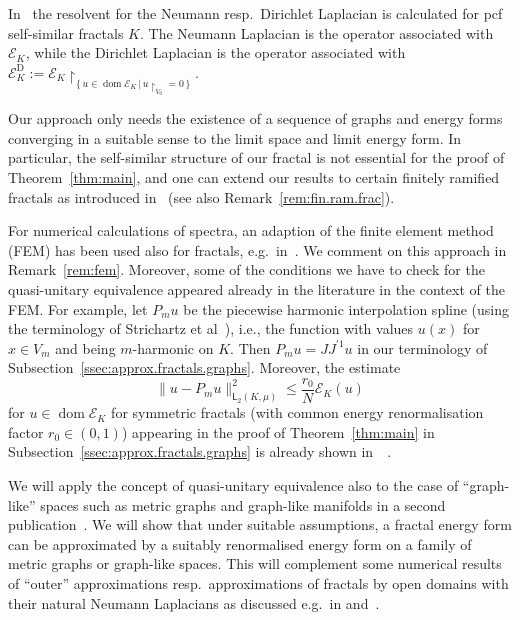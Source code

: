 \documentclass[12pt,reqno,a4paper]{amsart}            %
\numberwithin{equation}{section}
\theoremstyle{mythmstyle}       %
\newcounter{intro}
\theoremstyle{mydefstyle}        %
\newcommand{\Subsec}[1]{Subsection~\ref{ssec:#1}}
\newcommand{\Thm}[1]{Theorem~\ref{thm:#1}}
\newcommand{\Rem}[1]{Remark~\ref{rem:#1}}
\newcommand{\normsymb}{\|}
\newcommand{\normsqr}[2][{}]{\normsymb{#2}\normsymb^2_{#1}} %
\newcommand{\set}[2]{\{ \, #1 \, | \, #2 \, \} }      %
\newcommand{\restr}[1]{{\restriction}_{#1}} %
\DeclareMathOperator{\dom}    {dom}
\newcommand{\1}{\mathbbm 1}                    %
\newcommand{\Lsymb}    {\mathsf L}     %
\newcommand{\Lpspace}[1][p]    {\Lsymb_{#1}}     %
\newcommand{\Lsqrspace}    {\Lpspace[2]}     %
\newcommand{\Lsqr}[2][{}]{\Lsqrspace^{#1}({#2})} %
\newcommand{\Dir}{{\mathrm D}}              %
\newcommand{\pcf}{pcf\xspace}
\newcommand{\energy}{\mathcal E}
\begin{document}
In~\cite{iprrs:10} the resolvent for the Neumann resp.\ Dirichlet
Laplacian is calculated for \pcf self-similar fractals $K$.  The
Neumann Laplacian is the operator associated with $\energy_K$, while
the Dirichlet Laplacian is the operator associated with
$\energy_K^\Dir := \energy_K \restr {\set{u \in \dom \energy_K}{u
    \restr {V_0}=0}}$.

Our approach only needs the existence of a sequence of graphs and
energy forms converging in a suitable sense to the limit space and
limit energy form.  In particular, the self-similar structure of our
fractal is not essential for the proof of \Thm{main}, and one can
extend our results to certain finitely ramified fractals as introduced
in~\cite{teplyaev:08} (see also \Rem{fin.ram.frac}).

For numerical calculations of spectra, an adaption of the finite
element method (FEM) has been used also for fractals, e.g.\
in~\cite{grs:01,asst:01}.  We comment on this approach in \Rem{fem}.
Moreover, some of the conditions we have to check for the
quasi-unitary equivalence appeared already in the literature
in the context of the FEM.  For example, let $P_mu$ be the piecewise
harmonic interpolation spline (using the terminology of Strichartz et
al~\cite{strichartz-usher:00,grs:01}), i.e., the function with values
$u(x)$ for $x \in V_m$ and being $m$-harmonic on $K$.  Then
$P_mu=JJ^{\prime 1}u$ in our terminology of
\Subsec{approx.fractals.graphs}.  Moreover, the estimate
\begin{equation*}
  \normsqr[\Lsqr{K,\mu}]{u- P_m u}
  \le \frac{r_0}N \energy_K(u)
\end{equation*}
for $u \in \dom \energy_K$ for symmetric fractals (with common energy
renormalisation factor $r_0 \in (0,1)$) appearing in the proof of
\Thm{main} in \Subsec{approx.fractals.graphs} is already shown
in~~\cite[Thm.~3.4]{grs:01}.

We will apply the concept of quasi-unitary equivalence also to the
case of ``graph-like'' spaces such as metric graphs and graph-like
manifolds in a second publication~\cite{post-simmer:pre18}. We will
show that under suitable assumptions, a fractal energy form can be
approximated by a suitably renormalised energy form on a family of
metric graphs or graph-like spaces.  This will complement some
numerical results of ``outer'' approximations resp.\ approximations of
fractals by open domains with their natural Neumann Laplacians as
discussed e.g.~in \cite[pp~50--51,
Fig.14-15]{bsu:08} %
and~\cite{bhs:09}. %
\end{document}
